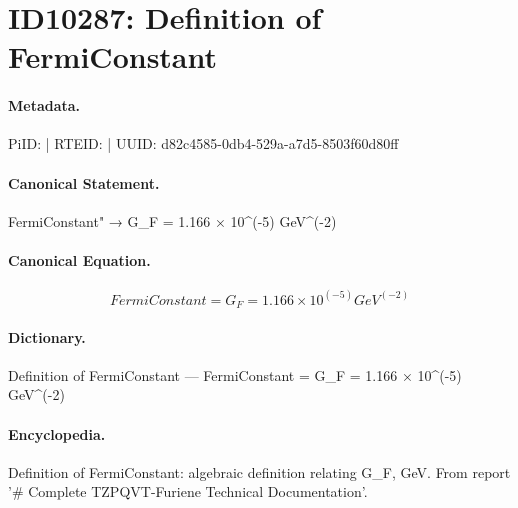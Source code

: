 \section*{ID10287: Definition of FermiConstant}
\paragraph{Metadata.}
PiID:  | RTEID:  | UUID: d82c4585-0db4-529a-a7d5-8503f60d80ff

\paragraph{Canonical Statement.}
FermiConstant" → G\_F = 1.166 × 10\textasciicircum{}(-5) GeV\textasciicircum{}(-2)

\paragraph{Canonical Equation.}
\[
FermiConstant = G_F = 1.166 × 10^(-5) GeV^(-2)
\]

\paragraph{Dictionary.}
Definition of FermiConstant — FermiConstant = G\_F = 1.166 × 10\textasciicircum{}(-5) GeV\textasciicircum{}(-2)

\paragraph{Encyclopedia.}
Definition of FermiConstant: algebraic definition relating G\_F, GeV. From report '\# Complete TZPQVT-Furiene Technical Documentation'.
